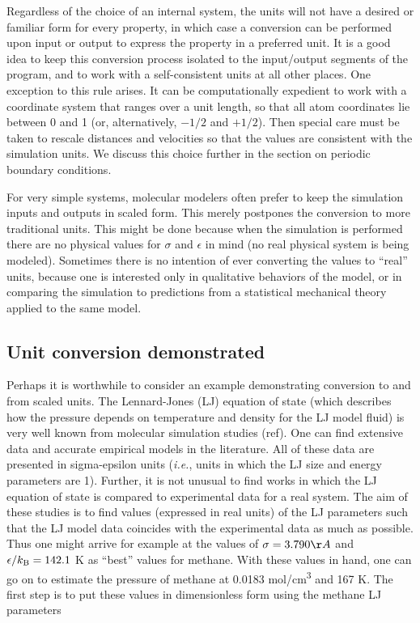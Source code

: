 \documentclass[9pt,bestpractices]{molsim}
\begin{document}
Regardless of the choice of an internal system, the units will not have
a desired or familiar form for every property, in which case a
conversion can be performed upon input or output to express the property
in a preferred unit. It is a good idea to keep this conversion process
isolated to the input/output segments of the program, and to work with a
self-consistent units at all other places. One exception to this rule
arises. It can be computationally expedient to work with a coordinate
system that ranges over a unit length, so that all atom coordinates lie
between 0 and 1 (or, alternatively, $-1/2$ and $+1/2$). Then special care
must be taken to rescale distances and velocities so that the values are
consistent with the simulation units. We discuss this choice further in
the section on periodic boundary conditions.

For very simple systems, molecular modelers often prefer to keep the
simulation inputs and outputs in scaled form. This merely postpones the
conversion to more traditional units. This might be done because when
the simulation is performed there are no physical values for $\sigma$ and $\epsilon$ in
mind (no real physical system is being modeled). Sometimes there is no
intention of ever converting the values to ``real'' units, because one
is interested only in qualitative behaviors of the model, or in
comparing the simulation to predictions from a statistical mechanical
theory applied to the same model.

\subsection{Unit conversion demonstrated}

Perhaps it is worthwhile to consider an example demonstrating conversion
to and from scaled units. The Lennard-Jones (LJ) equation of state (which describes how
the pressure depends on temperature and density for the LJ model fluid)
is very well known from molecular simulation studies (ref). One can find
extensive data and accurate empirical models in the literature. All of
these data are presented in sigma-epsilon units (\emph{i.e.}, units in
which the LJ size and energy parameters are 1). Further, it is not
unusual to find works in which the LJ equation of state is compared to
experimental data for a real system. The aim of these studies is to find
values (expressed in real units) of the LJ parameters such that the LJ
model data coincides with the experimental data as much as possible.
Thus one might arrive for example at the values of $\sigma = 3.790\AA$ and $\epsilon/k_{\rm B} =
142.1$ K as ``best'' values for methane. With
these values in hand, one can go on to estimate the pressure of methane
at 0.0183 mol/cm\textsuperscript{3} and 167 K. The first step is to put
these values in dimensionless form using the methane LJ parameters
\end{document}
